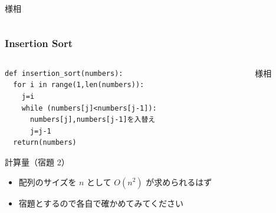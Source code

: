 \begin{frame}
\begin{columns}[t,onlytextwidth]
\begin{column}{0.55\linewidth}{様相}
\begin{center}
      \end{center}
    \end{column}
  \end{columns}
\end{frame}
\begin{frame}
\frametitle{Insertion Sort}
  \begin{columns}[t,onlytextwidth]
    \begin{column}{0.5\linewidth}
      \begin{lstlisting}[caption={擬似コード},label=insertion_sort]
def insertion_sort(numbers):
  for i in range(1,len(numbers)):
    j=i
    while (numbers[j]<numbers[j-1]):
      numbers[j],numbers[j-1]を入替え
      j=j-1
  return(numbers)
      \end{lstlisting}
      \begin{itembox}[l]{計算量（宿題 2）}
        \begin{itemize}
\tiny
\item 配列のサイズを $n$ として \(O(n^2)\) が求められるはず
\item 宿題とするので各自で確かめてみてください
        \end{itemize}
      \end{itembox}
    \end{column}
    \begin{column}{0.55\linewidth}{様相}
      \begin{center}

\end{center}
\end{column}
\end{columns}
\end{frame}
